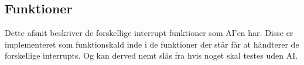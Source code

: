 \subsection{Funktioner}
Dette afsnit beskriver de forskellige interrupt funktioner som AI'en har. Disse er implementeret som funktionskald inde i de funktioner der står får at håndterer de forskellige interrupts. Og kan derved nemt slås fra hvis noget skal testes uden AI.





